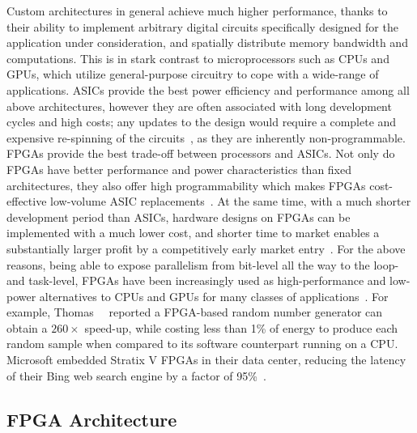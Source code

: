 Custom architectures in general achieve much higher performance, thanks to
their ability to implement arbitrary digital circuits specifically designed for
the application under consideration, and spatially distribute memory bandwidth
and computations.  This is in stark contrast to microprocessors such as CPUs
and GPUs, which utilize general-purpose circuitry to cope with a wide-range
of applications.  ASICs provide the best power efficiency and performance
among all above architectures, however they are often associated with long
development cycles and high costs; any updates to the design would require a
complete and expensive re-spinning of the circuits~\cite{bacon13}, as they
are inherently non-programmable.  FPGAs provide the best trade-off between
processors and ASICs.  Not only do FPGAs have better performance and power
characteristics than fixed architectures, they also offer high programmability
which makes FPGAs cost-effective low-volume ASIC replacements~\cite{karen04,
bacon13}.  At the same time, with a much shorter development period than
ASICs, hardware designs on FPGAs can be implemented with a much lower cost,
and shorter time to market enables a substantially larger profit by a
competitively early market entry~\cite{semico12}.  For the above reasons,
being able to expose parallelism from bit-level all the way to the loop- and
task-level, FPGAs have been increasingly used as high-performance and low-power
alternatives to CPUs and GPUs for many classes of applications~\cite{bacon13,
brodtkorb10, sirowy08}.  For example, Thomas~\etal~\cite{thomas09} reported a
FPGA-based random number generator can obtain a $260\times$ speed-up, while
costing less than 1\% of energy to produce each random sample when compared
to its software counterpart running on a CPU\@.  Microsoft embedded Stratix
V FPGAs in their data center, reducing the latency of their Bing web search
engine by a factor of 95\%~\cite{catapult}.


\subsection{FPGA Architecture}
\label{bg:sub:fpga_architecture}

